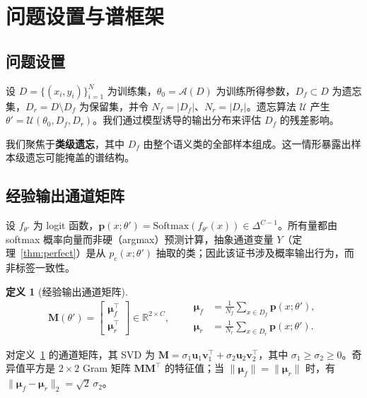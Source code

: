 \documentclass[11pt,a4paper]{article}
\newtheorem{definition}[theorem]{定义}
\begin{document}
\section{问题设置与谱框架}
\label{sec:channel}

\subsection{问题设置}

设 $D = \{(x_i, y_i)\}_{i=1}^N$ 为训练集，$\theta_0 = \mathcal{A}(D)$ 为训练所得参数，$D_f \subset D$ 为遗忘集，$D_r = D \setminus D_f$ 为保留集，并令 $N_f = |D_f|$、$N_r = |D_r|$。遗忘算法 $\mathcal{U}$ 产生 $\theta' = \mathcal{U}(\theta_0, D_f, D_r)$。我们通过模型诱导的输出分布来评估 $D_f$ 的残差影响。

我们聚焦于\textbf{类级遗忘}，其中 $D_f$ 由整个语义类的全部样本组成。这一情形暴露出样本级遗忘可能掩盖的谱结构。

\subsection{经验输出通道矩阵}

设 $f_{\theta'}$ 为 logit 函数，$\mathbf{p}(x;\theta') = \mathrm{Softmax}(f_{\theta'}(x)) \in \Delta^{C-1}$。所有量都由 softmax 概率向量而非硬（argmax）预测计算，抽象通道变量 $Y$（定理~\ref{thm:perfect}）是从 $p_c(x;\theta')$ 抽取的类；因此该证书涉及概率输出行为，而非标签一致性。

\begin{definition}[经验输出通道矩阵]
\label{def:M}
\begin{equation}
\mathbf{M}(\theta') =
\begin{bmatrix}
\boldsymbol{\mu}_f^\top \\ \boldsymbol{\mu}_r^\top
\end{bmatrix}
\in \mathbb{R}^{2\times C},
\qquad
\begin{aligned}
\boldsymbol{\mu}_f &= \frac{1}{N_f}\sum_{x\in D_f} \mathbf{p}(x;\theta'),\\
\boldsymbol{\mu}_r &= \frac{1}{N_r}\sum_{x\in D_r} \mathbf{p}(x;\theta').
\end{aligned}
\end{equation}
\end{definition}

对定义~\ref{def:M} 的通道矩阵，其 SVD 为 $\mathbf{M} = \sigma_1 \mathbf{u}_1 \mathbf{v}_1^\top + \sigma_2 \mathbf{u}_2 \mathbf{v}_2^\top$，其中 $\sigma_1 \ge \sigma_2 \ge 0$。奇异值平方是 $2\times 2$ Gram 矩阵 $\mathbf{M}\mathbf{M}^\top$ 的特征值；当 $\|\boldsymbol{\mu}_f\| = \|\boldsymbol{\mu}_r\|$ 时，有 $\|\boldsymbol{\mu}_f - \boldsymbol{\mu}_r\|_2 = \sqrt{2}\,\sigma_2$。
\end{document}
